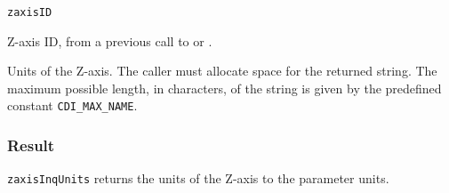 \hspace*{4mm}\begin{minipage}[]{15cm}
\begin{deflist}{\texttt{zaxisID}\ }
\item[\texttt{zaxisID}]
Z-axis ID, from a previous call to {} or {}.
\item[\texttt{units}]
Units of the Z-axis. The caller must allocate space for the
                    returned string. The maximum possible length, in characters, of
                    the string is given by the predefined constant {\texttt{CDI\_MAX\_NAME}}.

\end{deflist}
\end{minipage}

\subsubsection*{Result}

{\texttt{zaxisInqUnits}} returns the units of the Z-axis to the parameter units.

